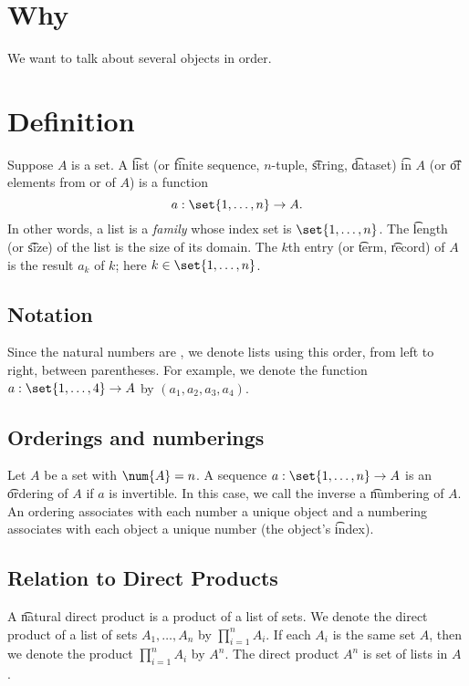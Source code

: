 
\section*{Why}

We want to talk about several objects in order.

\section*{Definition}

Suppose $A$ is a set.
A \t{list} (or \t{finite sequence}, \t{$n$-tuple}, \t{string}, \t{dataset}) \t{in} $A$ (or \t{of} elements from or of $A$) is a function
\[
a: \set{1, \dots , n} \to A.
\]
In other words, a list is a \textit{family} whose index set is $\set{1, \dots , n}$.
The \t{length} (or \t{size}) of the list is the size of its domain.
The \t{$k$th entry} (or \t{term}, \t{record}) of $A$ is the result $a_k$ of $k$; here $k \in \set{1, \dots , n}$.

\subsection*{Notation}

Since the natural numbers are , we denote lists using this order, from left to right, between parentheses.
For example, we denote the function $a: \set{1, \dots , 4} \to A$ by $(a_1, a_2, a_3, a_4)$.

\subsection*{Orderings and numberings}

Let $A$ be a set with $\num{A} = n$.
A sequence $a: \set{1, \dots , n} \to A$ is an \t{ordering} of $A$ if $a$ is invertible.
In this case, we call the inverse a \t{numbering} of $A$.
An ordering associates with each number a unique object and a numbering associates with each object a unique number (the object's \t{index}).

\subsection*{Relation to Direct Products}

A \t{natural direct product} is a product of a list of sets.
We denote the direct product of a list of sets $A_1, \dots , A_n$ by $\prod_{i = 1}^{n} A_i$.
If each $A_i$ is the same set $A$, then we denote the product $\prod_{i = 1}^{n} A_i$ by $A^n$.
The direct product $A^n$ is set of lists in $A$ .

